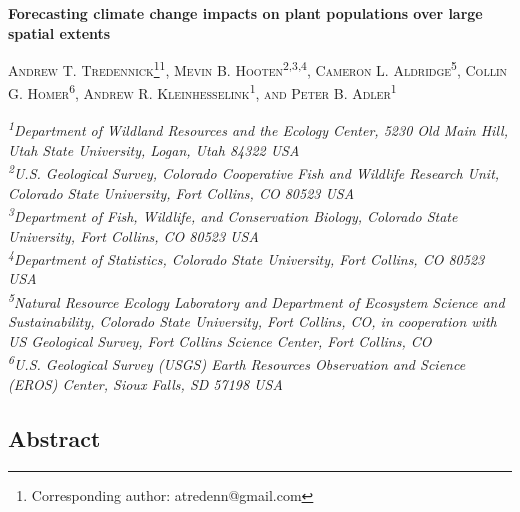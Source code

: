 \documentclass[12pt,]{article}
\title{}
\author{}
\date{}
\let\rmarkdownfootnote\footnote%
\def\footnote{\protect\rmarkdownfootnote}
\begin{document}
\renewcommand*{\thefootnote}{\fnsymbol{footnote}}


\begin{centering}
\textbf{\large{Forecasting climate change impacts on plant populations over large spatial extents}}

\textsc{\small{Andrew T. Tredennick\footnote{Corresponding author: atredenn@gmail.com}\textsuperscript{1}, Mevin B. Hooten\textsuperscript{2,3,4}, Cameron L. Aldridge\textsuperscript{5}, Collin G. Homer\textsuperscript{6}, Andrew R. Kleinhesselink\textsuperscript{1}, and Peter B. Adler\textsuperscript{1}}}

\textit{\small{\textsuperscript{1}Department of Wildland Resources and the Ecology Center, 5230 Old Main Hill, Utah State University, Logan, Utah 84322 USA}} \\
\textit{\small{\textsuperscript{2}U.S. Geological Survey, Colorado Cooperative Fish and Wildlife Research Unit, Colorado State University, Fort Collins, CO 80523 USA}} \\
\textit{\small{\textsuperscript{3}Department of Fish, Wildlife, and Conservation Biology, Colorado State University, Fort Collins, CO 80523 USA}} \\
\textit{\small{\textsuperscript{4}Department of Statistics, Colorado State University, Fort Collins, CO 80523 USA}} \\
\textit{\small{\textsuperscript{5}Natural Resource Ecology Laboratory and Department of Ecosystem Science and Sustainability, Colorado State University, Fort Collins, CO, in cooperation with US Geological Survey, Fort Collins Science Center, Fort Collins, CO}}\\
\textit{\small{\textsuperscript{6}U.S. Geological Survey (USGS) Earth Resources Observation and Science (EROS) Center, Sioux Falls, SD 57198 USA}}

\end{centering}

\renewcommand*{\thefootnote}{\arabic{footnote}}

\setcounter{footnote}{0}

\subsection{Abstract}\label{abstract}
\end{document}
